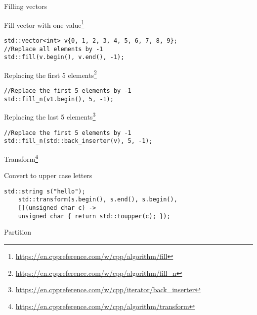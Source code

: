 \documentclass[\classoption]{beamer}
\begin{document}
\begin{frame}[fragile]{Filling vectors}

\begin{block}{Fill vector with one value\footnote{\tiny\url{https://en.cppreference.com/w/cpp/algorithm/fill}}}
\begin{lstlisting}
std::vector<int> v{0, 1, 2, 3, 4, 5, 6, 7, 8, 9};
//Replace all elements by -1
std::fill(v.begin(), v.end(), -1);
\end{lstlisting}
\end{block}

\begin{block}{Replacing the first 5 elements\footnote{\tiny\url{https://en.cppreference.com/w/cpp/algorithm/fill_n}}}
\begin{lstlisting}
//Replace the first 5 elements by -1
std::fill_n(v1.begin(), 5, -1);
\end{lstlisting}
\end{block}

\begin{block}{Replacing the last 5 elements\footnote{\tiny\url{https://en.cppreference.com/w/cpp/iterator/back_inserter}}}
\begin{lstlisting}
//Replace the first 5 elements by -1
std::fill_n(std::back_inserter(v), 5, -1);
\end{lstlisting}
\end{block}

\end{frame}


\begin{frame}[fragile]{Transform\footnote{\tiny\url{https://en.cppreference.com/w/cpp/algorithm/transform}}}

\begin{block}{Convert to upper case letters}
\begin{lstlisting}
std::string s("hello");
    std::transform(s.begin(), s.end(), s.begin(),
    [](unsigned char c) -> 
    unsigned char { return std::toupper(c); });
\end{lstlisting}
\end{block}


\end{frame}

\begin{frame}{Partition}



\end{frame}
\end{document}
